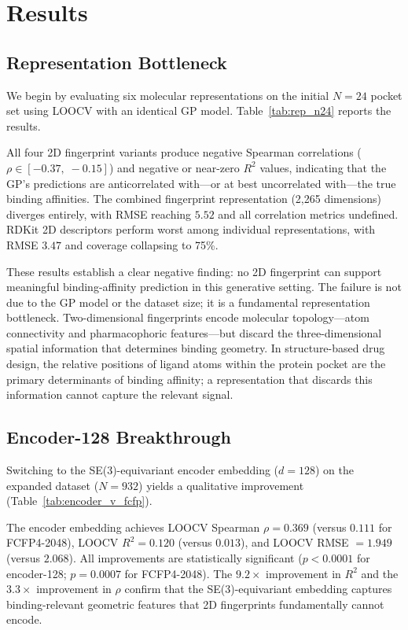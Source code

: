 \documentclass{article}
\begin{document}
\section{Results}

\subsection{Representation Bottleneck}

We begin by evaluating six molecular representations on the initial
$N = 24$ pocket set using LOOCV with an identical GP model.
Table~\ref{tab:rep_n24} reports the results.

All four 2D fingerprint variants produce negative Spearman correlations
($\rho \in [-0.37,\;-0.15]$) and negative or near-zero $R^{2}$ values,
indicating that the GP's predictions are anticorrelated with---or at
best uncorrelated with---the true binding affinities.  The combined
fingerprint representation (2{,}265 dimensions) diverges entirely, with
RMSE reaching $5.52$ and all correlation metrics undefined.  RDKit 2D
descriptors perform worst among individual representations, with RMSE
$3.47$ and coverage collapsing to 75\%.

These results establish a clear negative finding: no 2D fingerprint can
support meaningful binding-affinity prediction in this generative
setting.  The failure is not due to the GP model or the dataset size; it
is a fundamental representation bottleneck.  Two-dimensional fingerprints
encode molecular topology---atom connectivity and pharmacophoric
features---but discard the three-dimensional spatial information that
determines binding geometry.  In structure-based drug design, the
relative positions of ligand atoms within the protein pocket are the
primary determinants of binding affinity; a representation that discards
this information cannot capture the relevant signal.

\subsection{Encoder-128 Breakthrough}

Switching to the SE(3)-equivariant encoder embedding ($d = 128$) on the
expanded dataset ($N = 932$) yields a qualitative improvement
(Table~\ref{tab:encoder_v_fcfp}).

The encoder embedding achieves LOOCV Spearman $\rho = 0.369$ (versus
$0.111$ for FCFP4-2048), LOOCV $R^{2} = 0.120$ (versus $0.013$), and
LOOCV RMSE $= 1.949$ (versus $2.068$).  All improvements are
statistically significant ($p < 0.0001$ for encoder-128; $p = 0.0007$
for FCFP4-2048).  The $9.2\times$ improvement in $R^{2}$ and the
$3.3\times$ improvement in $\rho$ confirm that the SE(3)-equivariant
embedding captures binding-relevant geometric features that 2D
fingerprints fundamentally cannot encode.
\end{document}
